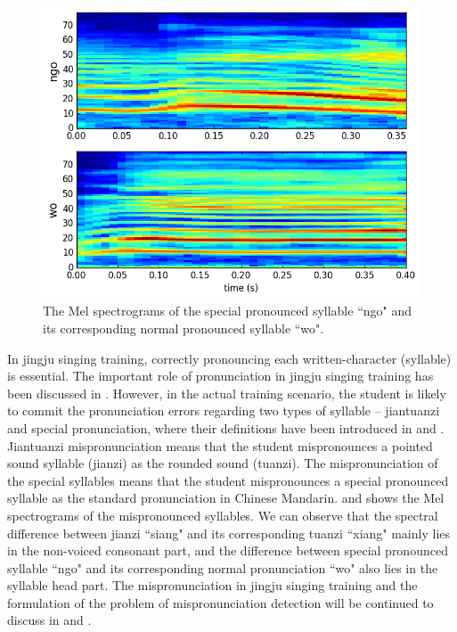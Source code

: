\begin{figure}[ht!]
    \includegraphics[width=\textwidth]{figs/spectro_vis/ch3_special_mispronunciation.png}
    \caption{The Mel spectrograms of the special pronounced syllable ``ngo" and its corresponding normal pronounced syllable ``wo".}
        \label{fig:ch3:special_mispronunciation_example}
\end{figure}

In jingju singing training, correctly pronouncing each written-character (syllable) is essential. The important role of pronunciation in jingju singing training has been discussed in . However, in the actual training scenario, the student is likely to commit the pronunciation errors regarding two types of syllable -- jiantuanzi and special pronunciation, where their definitions have been introduced in  and . Jiantuanzi mispronunciation means that the student mispronounces a pointed sound syllable (jianzi) as the rounded sound (tuanzi). The mispronunciation of the special syllables means that the student mispronounces a special pronounced syllable as the standard pronunciation in Chinese Mandarin.  and  shows the Mel spectrograms of the mispronounced syllables. We can observe that the spectral difference between jianzi ``siang" and its corresponding tuanzi ``xiang" mainly lies in the non-voiced consonant part, and the difference between special pronounced syllable ``ngo" and its corresponding normal pronunciation ``wo" also lies in the syllable head part. The mispronunciation in jingju singing training and the formulation of the problem of mispronunciation detection will be continued to discuss in  and .


